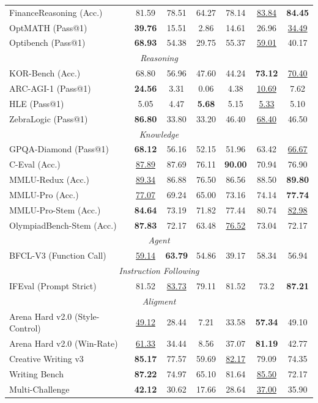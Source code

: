 \documentclass[table]{gtech}
\theoremstyle{definition}
\begin{document}
\begin{table}[t]
{\begin{tabular}{lcccccc}
 FinanceReasoning (Acc.) & 81.59 & 78.51 & 64.27 & 78.14 & \underline{83.84} & \textbf{84.45} \\
 OptMATH (Pass@1) & \textbf{39.76} & 15.51 & 2.86 & 14.61 & 26.96 & \underline{34.49} \\
 Optibench (Pass@1) & \textbf{68.93} & 54.38 & 29.75 & 55.37 & \underline{59.01} & 40.17 \\
\midrule \multicolumn{7}{c}{\textit{Reasoning}} \\
\midrule KOR-Bench (Acc.) & 68.80 & 56.96 & 47.60 & 44.24 & \textbf{73.12} & \underline{70.40} \\
 ARC-AGI-1 (Pass@1) & \textbf{24.56} & 3.31 & 0.06 & 4.38 & \underline{10.69} & 7.62 \\
 HLE (Pass@1) & 5.05 & 4.47 & \textbf{5.68} & 5.15 & \underline{5.33} & 5.10 \\
 ZebraLogic (Pass@1) & \textbf{86.80} & 33.80 & 33.20 & 46.40 & \underline{68.40} & 46.50 \\
\midrule \multicolumn{7}{c}{\textit{Knowledge}} \\
\midrule GPQA-Diamond (Pass@1) & \textbf{68.12} & 56.16 & 52.15 & 51.96 & 63.42 & \underline{66.67} \\
 C-Eval (Acc.) & \underline{87.89} & 87.69 & 76.11 & \textbf{90.00} & 70.94 & 76.90 \\
 MMLU-Redux (Acc.) & \underline{89.34} & 86.88 & 76.50 & 86.56 & 88.50 & \textbf{89.80} \\
 MMLU-Pro (Acc.) & \underline{77.07} & 69.24 & 65.00 & 73.16 & 74.14 & \textbf{77.74} \\
 MMLU-Pro-Stem (Acc.) & \textbf{84.64} & 73.19 & 71.82 & 77.44 & 80.74 & \underline{82.98} \\
 OlympiadBench-Stem (Acc.) & \textbf{87.83} & 72.17 & 63.48 & \underline{76.52} & 73.04 & 72.17 \\
\midrule \multicolumn{7}{c}{\textit{Agent}} \\
\midrule BFCL-V3 (Function Call) & \underline{59.14} & \textbf{63.79} & 54.86 & 39.17 & 58.34 & 56.94 \\
\midrule \multicolumn{7}{c}{\textit{Instruction Following}} \\
\midrule IFEval (Prompt Strict) & 81.52 & \underline{83.73} & 79.11 & 81.52 & 73.2 & \textbf{87.21} \\
\midrule \multicolumn{7}{c}{\textit{Aligment}} \\
\midrule Arena Hard v2.0 (Style-Control) & \underline{49.12} & 28.44 & 7.21 & 33.58 & \textbf{57.34} & 49.10 \\
 Arena Hard v2.0 (Win-Rate) & \underline{61.33} & 34.44 & 8.56 & 37.07 & \textbf{81.19} & 42.77 \\
 Creative Writing v3 & \textbf{85.17} & 77.57 & 59.69 & \underline{82.17} & 79.09 & 74.35 \\
 Writing Bench & \textbf{87.22} & 74.97 & 65.10 & 81.64 & \underline{85.50} & 72.17 \\
Multi-Challenge & \textbf{42.12} & 30.62 & 17.66 & 28.64 & \underline{37.00} & 35.90 \\
\hline
\end{tabular}
}
\end{table}
\end{document}
